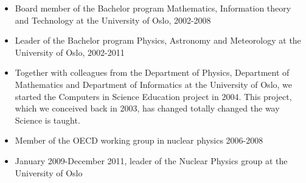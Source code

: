 \documentclass[%
oneside,                 %
final,                   %
10pt]{article}
\begin{document}
\begin{itemize}
\item Board member of the Bachelor program Mathematics, Information theory and Technology at the University of Oslo, 2002-2008

\item Leader of the Bachelor program Physics, Astronomy and Meteorology at the University of Oslo, 2002-2011

\item Together with colleagues from the Department of Physics, Department of Mathematics and Department of Informatics at the University of Oslo, we started   the Computers in Science Education project in 2004. This project, which we conceived back in 2003,  has changed totally changed the way Science is taught.

\item Member of the OECD working group in nuclear physics 2006-2008

\item January 2009-December 2011, leader of the Nuclear Physics group at the University of Oslo
\end{itemize}

\noindent
\end{document}
